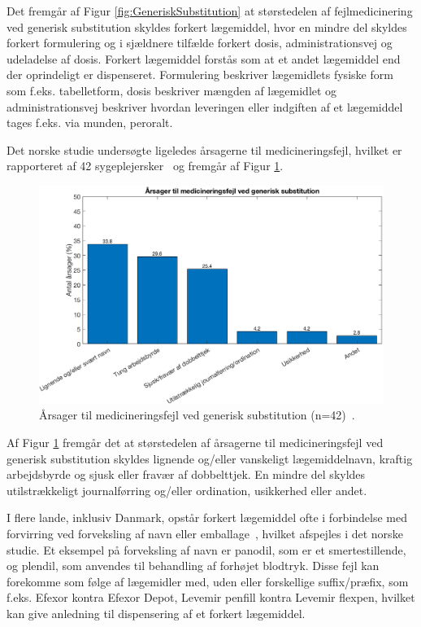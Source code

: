 Det fremgår af Figur \ref{fig:GeneriskSubstitution} at størstedelen af fejlmedicinering ved generisk substitution skyldes forkert lægemiddel, hvor en mindre del skyldes forkert formulering og i sjældnere tilfælde forkert dosis, administrationsvej og udeladelse af dosis. Forkert lægemiddel forstås som at et andet lægemiddel end der oprindeligt er dispenseret. Formulering beskriver lægemidlets fysiske form som f.eks. tabelletform, dosis beskriver mængden af lægemidlet og administrationsvej beskriver hvordan leveringen eller indgiften af et lægemiddel tages f.eks. via munden, peroralt.

Det norske studie undersøgte ligeledes årsagerne til medicineringsfejl, hvilket er rapporteret af 42 sygeplejersker~\citep{Hakonsen2010} og fremgår af Figur \ref{fig:GeneriskSubstitution1}.

\begin{figure}[H]\centering	\includegraphics[width=1\textwidth]{billeder/GenSub1.png} 
	\caption{Årsager til medicineringsfejl ved generisk substitution (n=42)~\citep{Hakonsen2010}.}	\label{fig:GeneriskSubstitution1}  
\end{figure}

Af Figur \ref{fig:GeneriskSubstitution1} fremgår det at størstedelen af årsagerne til medicineringsfejl ved generisk substitution skyldes lignende og/eller vanskeligt lægemiddelnavn, kraftig arbejdsbyrde og sjusk eller fravær af dobbelttjek. En mindre del skyldes utilstrækkeligt journalførring og/eller ordination, usikkerhed eller andet. 

I flere lande, inklusiv Danmark, opstår forkert lægemiddel ofte i forbindelse med forvirring ved forveksling af navn eller emballage~\citep{DanskSelskabforPatientsikkerhed2009}, hvilket afspejles i det norske studie. Et eksempel på forveksling af navn er panodil, som er et smertestillende, og plendil, som anvendes til behandling af forhøjet blodtryk. Disse fejl kan forekomme som følge af lægemidler med, uden eller forskellige suffix/præfix, som f.eks. Efexor kontra Efexor Depot, Levemir penfill kontra Levemir flexpen, hvilket kan give anledning til dispensering af et forkert lægemiddel.~\citep{DanskSelskabforPatientsikkerhed2009}

